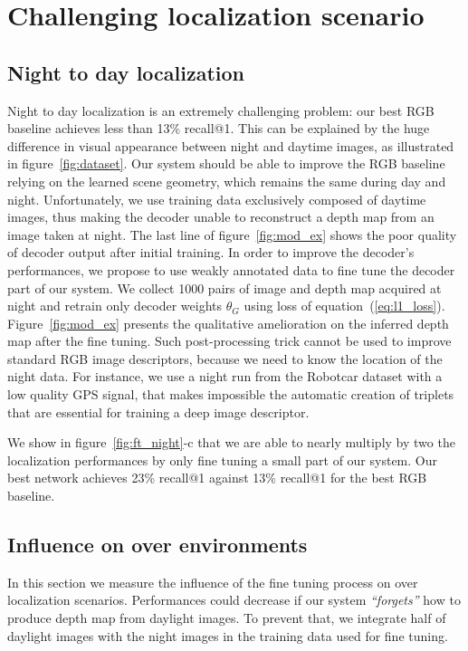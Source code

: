 \section{Challenging localization scenario}
\label{sec:chall_loc}

\subsection{Night to day localization}
\label{subsec:night2day}

Night to day localization is an extremely challenging problem: our best RGB baseline achieves less than 13\% recall@1. This can be explained by the huge difference in visual appearance between night and daytime images, as illustrated in figure~\ref{fig:dataset}. Our system should be able to improve the RGB baseline relying on the learned scene geometry, which remains the same during day and night. Unfortunately, we use training data exclusively composed of daytime images, thus making the decoder unable to reconstruct a depth map from an image taken at night. The last line of figure~\ref{fig:mod_ex} shows the poor quality of decoder output after initial training. In order to improve the decoder's performances, we propose to use weakly annotated data to fine tune the decoder part of our system. We collect 1000 pairs of image and depth map acquired at night and retrain only decoder weights $\theta_G$ using loss of equation~(\ref{eq:l1_loss}). Figure~\ref{fig:mod_ex} presents the qualitative amelioration on the inferred depth map after the fine tuning. Such post-processing trick cannot be used to improve standard RGB image descriptors, because we need to know the location of the night data. For instance, we use a night run from the Robotcar dataset with a low quality GPS signal, that makes impossible the automatic creation of triplets that are essential for training a deep image descriptor. 

We show in figure~\ref{fig:ft_night}-c that we are able to nearly multiply by two the localization performances by only fine tuning a small part of our system. Our best network achieves 23\% recall@1 against 13\% recall@1 for the best RGB baseline.





\subsection{Influence on over environments}
\label{subsec:night2day_inf}
In this section we measure the influence of the fine tuning process on over localization scenarios. Performances could decrease if our system \textit{``forgets''} how to produce depth map from daylight images. To prevent that, we integrate half of daylight images with the night images in the training data used for fine tuning. 

